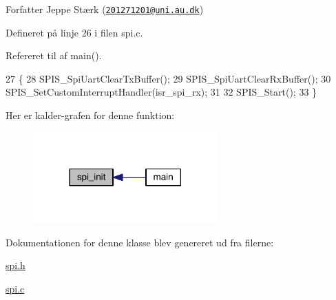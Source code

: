 \begin{DoxyAuthor}{Forfatter}
Jeppe Stærk (\href{mailto:201271201@uni.au.dk}{\tt 201271201@uni.\+au.\+dk}) 
\end{DoxyAuthor}


Defineret på linje 26 i filen spi.\+c.



Refereret til af main().


\begin{DoxyCode}
27 \{
28   SPIS\_SpiUartClearTxBuffer();
29   SPIS\_SpiUartClearRxBuffer();
30   SPIS\_SetCustomInterruptHandler(isr\_spi\_rx);
31   
32   SPIS\_Start();
33 \}
\end{DoxyCode}


Her er kalder-\/grafen for denne funktion\+:\nopagebreak
\begin{figure}[H]
\begin{center}
\leavevmode
\includegraphics[width=201pt]{class_s_p_i_a5db0aceecaf7db5fbe2984e88fef3734_icgraph}
\end{center}
\end{figure}




Dokumentationen for denne klasse blev genereret ud fra filerne\+:\begin{DoxyCompactItemize}
\item 
\hyperlink{spi_8h}{spi.\+h}\item 
\hyperlink{spi_8c}{spi.\+c}\end{DoxyCompactItemize}

